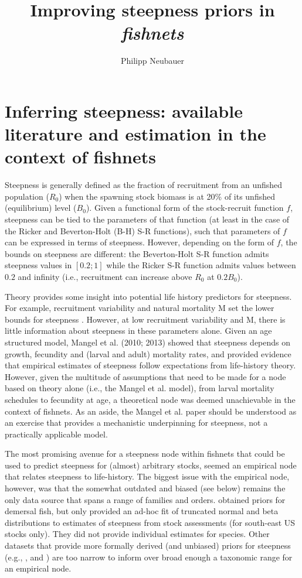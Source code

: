 \documentclass{dragonfly-report}
\title{Improving steepness priors in \emph{fishnets}}{Improving
  priors for the steepness of the stock-recruitment function within the R package \emph{fishnets}}
\subtitle{}
\author{Philipp Neubauer}
\begin{document}
\maketitle

\section{Inferring steepness: available literature and estimation in the context of fishnets}

Steepness is generally defined as the fraction of recruitment from an unfished population ($R_0$) when the spawning stock biomass is at 20\% of its unfished (equilibrium) level ($B_0$). Given a functional form of the stock-recruit function $f$, steepness can be tied to the parameters of that function (at least in the case of the Ricker and Beverton-Holt (B-H) S-R functions), such that parameters of $f$ can be expressed in terms of steepness. However, depending on the form of $f$, the bounds on steepness are different: the Beverton-Holt S-R function admits steepness values in $[0.2;1]$ while the Ricker S-R function admits values between $0.2$ and infinity (i.e., recruitment can increase above $R_0$ at $0.2 B_0$). 

Theory provides some insight into potential life history predictors for steepness. For example, recruitment variability and natural mortality M set the lower bounds for steepness \citep{he_2006_prior}. However, at low recruitment variability and M, there is little information about steepness in these parameters alone. Given an age structured model, Mangel et al. (2010; 2013) showed that steepness depends on growth, fecundity and (larval and adult) mortality rates, and \citet{rose2001compensatory} provided evidence that empirical estimates of steepness follow expectations from life-history theory. However, given the multitude of assumptions that need to be made for a node based on theory alone (i.e., the Mangel et al. model), from larval mortality schedules to fecundity at age, a theoretical node was deemed unachievable in the context of fishnets. As an aside, the Mangel et al. paper should be understood as an exercise that provides a mechanistic underpinning for steepness, not a practically applicable model. 

The most promising avenue for a steepness node within fishnets that could be used to predict steepness for (almost) arbitrary stocks, seemed an empirical node that relates steepness to life-history. The biggest issue with the empirical node, however, was that the somewhat outdated and biased (see below) \citet{myers_1999_maximum} remains the only data source that spans a range of families and orders. \citet{shertzer2012spawner} obtained priors for demersal fish, but only provided an ad-hoc fit of truncated normal and beta distributions to estimates of steepness from stock assessments (for south-east US stocks only). They did not provide individual estimates for species. Other datasets that provide more formally derived (and unbiased) priors for steepness (e.g., \citet{michielsens_2004_bayesian}, \citet{dorn2002advice} and \citet{forrest2010hierarchical}) are too narrow to inform over broad enough a taxonomic range for an empirical node.
\end{document}
